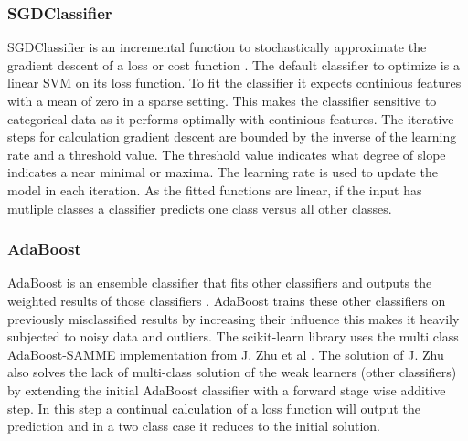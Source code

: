 \documentclass[a4paper,10pt]{article}
\begin{document}
\subsubsection{SGDClassifier}
SGDClassifier is an incremental function to stochastically approximate the gradient descent of a loss or cost function \cite{SGDClass}. The default classifier to optimize is a linear SVM on its loss function. To fit the classifier it expects continious features with a mean of zero in a sparse setting. This makes the classifier sensitive to categorical data as it performs optimally with continious features. The iterative steps for calculation gradient descent are bounded by the inverse of the learning rate and a threshold value. The threshold value indicates what degree of slope indicates a near minimal or maxima. The learning rate is used to update the model in each iteration. As the fitted functions are linear, if the input has mutliple classes a classifier predicts one class versus all other classes. 

\subsubsection{AdaBoost}
AdaBoost is an ensemble classifier that fits other classifiers and outputs the weighted results of those classifiers \cite{AdaBoost}. AdaBoost trains these other classifiers on previously misclassified results by increasing their influence this makes it heavily subjected to noisy data and outliers. The scikit-learn library uses the multi class AdaBoost-SAMME implementation from J. Zhu et al \cite{MadaB}. The solution of J. Zhu also solves the lack of multi-class solution of the weak learners (other classifiers) by extending the initial AdaBoost classifier with a forward stage wise additive step. In this step a continual calculation of a loss function will output the prediction and in a two class case it reduces to the initial solution.
\end{document}
